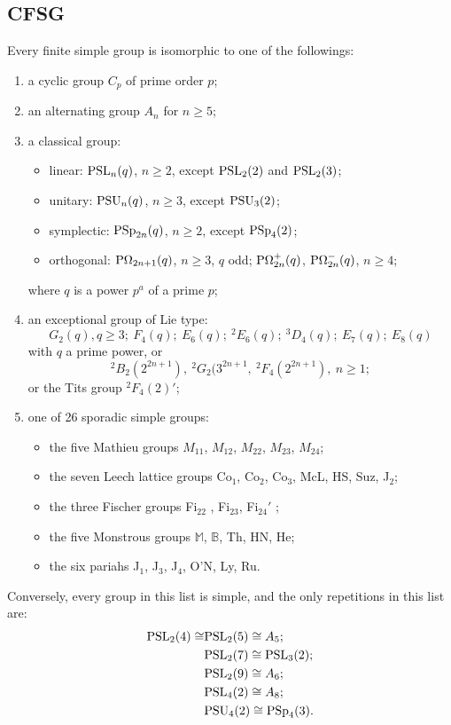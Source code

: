 \documentclass[a4paper,11pt]{article}
\begin{document}
\subsection{CFSG}
Every finite simple group is isomorphic to one of the followings:
\begin{enumerate}[itemsep=0pt,label=\roman*.]
	\item a cyclic group $C_p$ of prime order $p$;
	\item an alternating group $A_n$ for $n\geq 5$;
	\item a classical group:
		\begin{itemize}
			\item linear: $\mathrm{PSL}_n(q)$, $n\geq 2$, except $\mathrm{PSL}_2(2)$ and $\mathrm{PSL}_2(3)$;
			\item unitary: $\mathrm{PSU}_n(q)$, $n\geq 3$, except $\mathrm{PSU}_3(2)$;
			\item symplectic: $\mathrm{PSp}_{2n}(q)$, $n\geq 2$, except $\mathrm{PSp}_4(2)$;
			\item orthogonal: $\mathrm{P\Omega}_{2n+1}(q)$, $n\geq 3$, $q$ odd; $\mathrm{P\Omega}_{2n}^+(q)$, $\mathrm{P\Omega}_{2n}^-(q)$, $n\geq 4$;
		\end{itemize}
		where $q$ is a power $p^a$ of a prime $p$;
	\item an exceptional group of Lie type:
		\[ G_2(q),q\geq 3;\ F_4(q);\ E_6(q);\  ^2E_6(q);\ ^3D_4(q);\ E_7(q);\ E_8(q) \] with $q$ a prime power, or\[ ^2B_2(2^{2n+1}),\  ^2G_2(3^{2n+1},\ ^2F_4(2^{2n+1}),\ n\geq 1; \]or the Tits group $^2F_4(2)'$;
	\item one of 26 sporadic simple groups:
		\begin{itemize}
			\item the five Mathieu groups $M_{11}$, $M_{12}$, $M_{22}$, $M_{23}$, $M_{24}$;
			\item the seven Leech lattice groups Co$_1$, Co$_2$, Co$_3$, McL, HS, Suz, J$_2$;
			\item the three Fischer groups Fi$_{22}$ , Fi$_{23}$, Fi$_{24}'$ ;
			\item the five Monstrous groups $\mathbb{M}$, $\mathbb{B}$, Th, HN, He;
			\item the six pariahs J$_1$, J$_3$, J$_4$, O'N, Ly, Ru.
		\end{itemize}
\end{enumerate}
Conversely, every group in this list is simple, and the only repetitions in this list are:
\begin{equation*}
\begin{aligned}
	\mathrm{PSL}_2(4)\cong &\mathrm{PSL}_2(5)\cong A_5;\\
	&\mathrm{PSL}_2(7)\cong\mathrm{PSL}_3(2);\\
	&\mathrm{PSL}_2(9)\cong A_6;\\
	&\mathrm{PSL}_4(2)\cong A_8;\\
	&\mathrm{PSU}_4(2)\cong \mathrm{PSp}_4(3).
\end{aligned}
\end{equation*}
\end{document}
